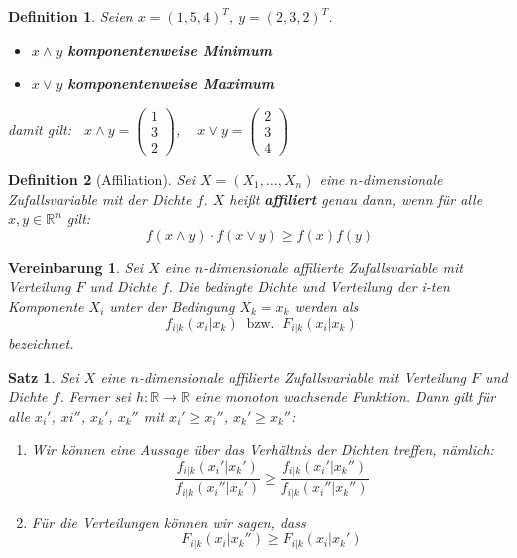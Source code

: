 \documentclass[12pt]{extreport} %
\theoremstyle{named}
\theoremstyle{itshape}
\newtheorem{satz}[unnamedtheorem]{Satz}
\newtheorem*{definition}{Definition}
\theoremstyle{normal}
\newtheorem*{vereinbarung}{Vereinbarung}
\begin{document}
 
\begin{definition}
	Seien $x = \left( 1, 5, 4 \right)^{T}$, $y = \left( 2, 3, 2 \right)^{T}$.
	\begin{itemize}
		\item $x \wedge y$ \textbf{komponentenweise Minimum}
		\item $x \vee y$ \textbf{komponentenweise Maximum}
	\end{itemize}
	damit gilt: $~$ $x \wedge y = \left(\begin{array}{c} 1 \\ 3 \\ 2 \end{array}\right)$, ~ $x \vee y = \left(\begin{array}{c} 2 \\ 3 \\ 4 \end{array}\right) $
\end{definition}

\begin{definition}[Affiliation]
	Sei $X = (X_{1}, \dotsc, X_{n})$ eine $n$-dimensionale Zufallsvariable mit der Dichte $f$. $X$ hei{\ss}t \textbf{affiliert} genau dann, wenn für alle $x, y \in \mathbb{R}^{n}$ gilt:
		$$ f(x \wedge y ) \cdot f(x \vee y) \geq f(x) f(y) $$	
\end{definition}

\begin{vereinbarung}
	Sei $X$ eine $n$-dimensionale affilierte Zufallsvariable mit Verteilung $F$ und Dichte $f$. Die bedingte Dichte und Verteilung der i-ten Komponente $X_{i}$ unter der Bedingung $X_{k} = x_{k}$ werden als
	$$ ~ f_{i|k}(x_{i}|x_{k}) ~ \text{ bzw. } ~ F_{i|k}(x_{i}|x_{k}) $$
	bezeichnet. 
\end{vereinbarung}


\begin{satz}
	Sei $X$ eine $n$-dimensionale affilierte Zufallsvariable mit Verteilung $F$ und Dichte $f$. Ferner sei $h \colon \mathbb{R} \rightarrow \mathbb{R}$ eine monoton wachsende Funktion. Dann gilt für alle $x_{i}'$, $x{i}''$, $x_{k}'$, $x_{k}''$ mit $x_{i}' \geq x_{i}''$, $x_{k}' \geq x_{k}''$:
	\begin{enumerate}
		\item Wir können eine Aussage über das Verhältnis der Dichten treffen, nämlich:
			$$\frac{f_{i|k}(x_{i}'|x_{k}')}{f_{i|k}(x_{i}''|x_{k}')} \geq \frac{f_{i|k}(x_{i}'|x_{k}'')}{f_{i|k}(x_{i}''|x_{k}'')}$$
		\item Für die Verteilungen können wir sagen, dass
			$$ F_{i|k}(x_{i}|x_{k}'') \geq F_{i|k}(x_{i}|x_{k}') $$
	\end{enumerate}	
\end{satz}
\end{document}
